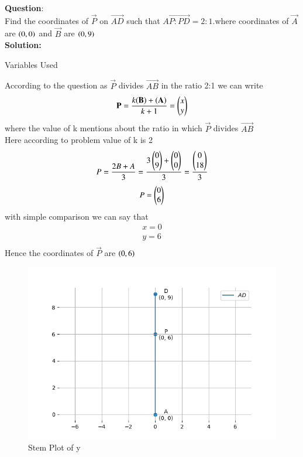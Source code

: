 \documentclass[journal]{IEEEtran}
\begin{document}
\textbf{Question}:\\
Find the coordinates of $\vec{P}$ on $\vec{AD}$ such that $\vec{AP:PD}=2:1.$where coordinates of $\vec{A}$ are $\left(0,0\right)$ and $\vec{B}$ are $\left(0,9\right)$
\\
\textbf{Solution: }
\begin{table}[h!]    
  \centering
  
  \caption{Variables Used}
  \label{tab10.5.3.9.1}
\end{table}
According to the question as $\vec{P}$ divides $\vec{AB}$ in the ratio 2:1 we can write\\
\begin{align}
\mathbf{P}=\frac{k(\mathbf{B})+(\mathbf{A})}{k+1}=\begin{pmatrix}x\\y\end{pmatrix}\\
\end{align}
where the value of k mentions about the ratio in which $\vec{P}$ divides $\vec{AB}$\\
Here according to problem value of k is 2\\
\begin{align}
P=\frac{2B+A}{3}=\frac{3\begin{pmatrix}0\\9\end{pmatrix}+\begin{pmatrix}0\\0\end{pmatrix}}{3}=\frac{\begin{pmatrix}0\\18\end{pmatrix}}{3}\\
\end{align}
\begin{align}
P=\begin{pmatrix}0\\6\end{pmatrix}
\end{align}
with simple comparison we can say that 
\begin{align}
x=0\\
y=6\\
\end{align}
Hence the coordinates of $\vec{P}$ are $\left(0,6\right)$
\begin{figure}[h!]
   \centering
   \includegraphics[width=0.7\linewidth]{figs/Fig1.png}
   \caption{Stem Plot of y}
   \label{stemplot}
\end{figure}
\end{document}
